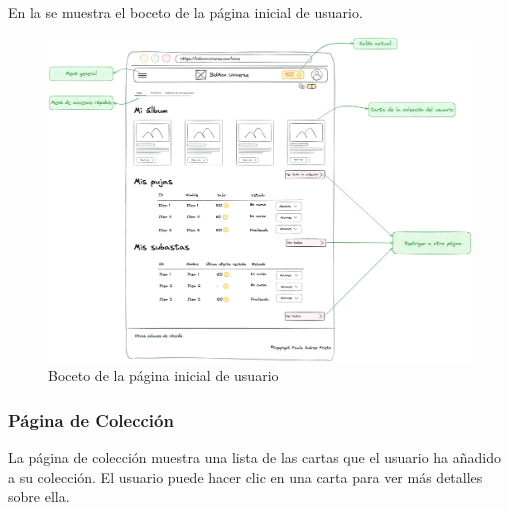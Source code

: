 En la  se muestra el boceto de la página inicial de usuario.

\begin{figure}[H]
    \centering
    \includegraphics[width=1\textwidth]{figures/6-Analisis/6-Interfaz/prototipos/home-logueada.png}
    \caption{Boceto de la página inicial de usuario}
    \label{fig:p_user_home}
    \hypertarget{fig:p_user_home}{}
\end{figure}

\subsubsection{Página de Colección}
La página de colección muestra una lista de las cartas que el usuario ha añadido a su colección.
El usuario puede hacer clic en una carta para ver más detalles sobre ella.

